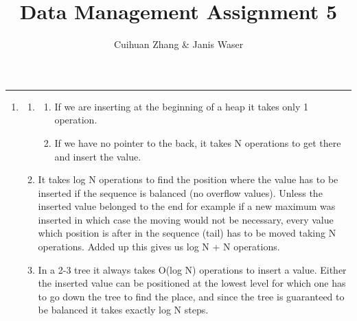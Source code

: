 \documentclass[12pt]{extarticle}
\title{Data Management Assignment 5}
\author{Cuihuan Zhang \& Janis Waser}
\begin{document}
\maketitle \vspace{-10mm}
\rule{\linewidth}{0.4pt}


\begin{flushleft}
\begin{enumerate}[label=\textbf{\Alph*.}]

\item 
\begin{enumerate}[label=\arabic*)]
\item \begin{enumerate}[label=(\alph*)]
\item If we are inserting at the beginning of a heap it takes only 1 operation. 
\item If we have no pointer to the back, it takes N operations to get there and insert the value.
\end{enumerate}
\item It takes log N operations to find the position where the value has to be inserted if the sequence is balanced (no overflow values). Unless the inserted value belonged to the end for example if a new maximum was inserted in which case the moving would not be necessary, every value which position is after in the sequence (tail) has to be moved taking N operations.  Added up this gives us log N + N operations. 
\item In a 2-3 tree it always takes O(log N) operations to insert a value. Either the inserted value can be positioned at the lowest level for which one has to go down the tree to find the place, and since the tree is guaranteed to be balanced it takes exactly log N steps.


\end{enumerate}
\end{enumerate}
\end{flushleft}
\end{document}
